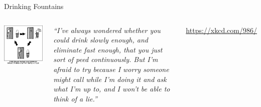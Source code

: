 
\begin{frame}[t,plain]
\titlepage
\end{frame}


\begin{frame}{Drinking Fountains}
%
\begin{columns}
\begin{center}
\includegraphics[width=.9\linewidth]{./gfx/03-xkcd-drinking-fountains}\\
\end{center}
%
\small
	\emph{\enquote{I've always wondered whether you could drink slowly enough, and eliminate fast enough, that you just sort of peed continuously.
		  But I'm afraid to try because I worry someone might call while I'm doing it and ask what I'm up to, and I won't be able to think of a lie.}}

	\vspace{6pt}
	\url{https://xkcd.com/986/}
\end{columns}
%
\end{frame}


